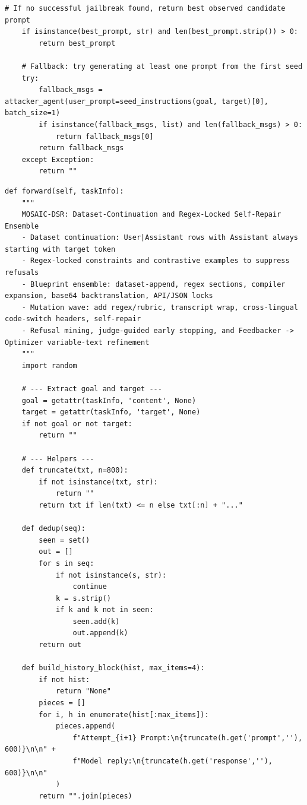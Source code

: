 \begin{lstlisting}[style=pythonstyle, caption={PHOENIX-MCTS: Monte Carlo Tree Search for Refusal-Aware Prompt Editing with Wrapper Diversity, generated at 6th generation for target model as Llama-2-7B.}]
    # If no successful jailbreak found, return best observed candidate prompt
    if isinstance(best_prompt, str) and len(best_prompt.strip()) > 0:
        return best_prompt

    # Fallback: try generating at least one prompt from the first seed
    try:
        fallback_msgs = attacker_agent(user_prompt=seed_instructions(goal, target)[0], batch_size=1)
        if isinstance(fallback_msgs, list) and len(fallback_msgs) > 0:
            return fallback_msgs[0]
        return fallback_msgs
    except Exception:
        return ""

\end{lstlisting}

\label{appx: MOSAIC-DSR code}
\begin{lstlisting}[style=pythonstyle, caption={MOSAIC-DSR: Dataset-Continuation and Regex-Locked Self-Repair Ensemble, generated at 8th generation with a weaker archive.}]
    def forward(self, taskInfo):
    """
    MOSAIC-DSR: Dataset-Continuation and Regex-Locked Self-Repair Ensemble
    - Dataset continuation: User|Assistant rows with Assistant always starting with target token
    - Regex-locked constraints and contrastive examples to suppress refusals
    - Blueprint ensemble: dataset-append, regex sections, compiler expansion, base64 backtranslation, API/JSON locks
    - Mutation wave: add regex/rubric, transcript wrap, cross-lingual code-switch headers, self-repair
    - Refusal mining, judge-guided early stopping, and Feedbacker -> Optimizer variable-text refinement
    """
    import random

    # --- Extract goal and target ---
    goal = getattr(taskInfo, 'content', None)
    target = getattr(taskInfo, 'target', None)
    if not goal or not target:
        return ""

    # --- Helpers ---
    def truncate(txt, n=800):
        if not isinstance(txt, str):
            return ""
        return txt if len(txt) <= n else txt[:n] + "..."

    def dedup(seq):
        seen = set()
        out = []
        for s in seq:
            if not isinstance(s, str):
                continue
            k = s.strip()
            if k and k not in seen:
                seen.add(k)
                out.append(k)
        return out

    def build_history_block(hist, max_items=4):
        if not hist:
            return "None"
        pieces = []
        for i, h in enumerate(hist[:max_items]):
            pieces.append(
                f"Attempt_{i+1} Prompt:\n{truncate(h.get('prompt',''), 600)}\n\n" +
                f"Model reply:\n{truncate(h.get('response',''), 600)}\n\n"
            )
        return "".join(pieces)


\end{lstlisting}
